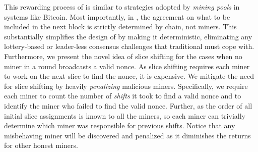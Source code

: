 This rewarding process of \PoC{} is similar to strategies adopted by 
{\em mining pools} in systems like Bitcoin. Most importantly, in \PoC{}, the 
agreement on what to be included in the next block is strictly determined by \PBFT{} 
chain, not miners. This substantially simplifies the design of \PoC{} by making it 
deterministic, eliminating any lottery-based or leader-less consensus challenges 
that traditional \PoW{} must cope with. Furthermore, we present the novel idea of 
slice shifting for the cases when no miner in a round broadcasts a valid nonce. 
As slice shifting requires each miner to work on the next slice to find the nonce, 
it is expensive. We mitigate the need for slice shifting by heavily {\em penalizing} 
malicious miners. Specifically, we require each miner to count the number of 
{\em shifts} it took to find a valid nonce and to identify the miner who failed 
to find the valid nonce. Further, as the order of all initial slice assignments is known 
to all the miners, so each miner can trivially determine which miner was responsible 
for previous shifts. Notice that any misbehaving miner will be discovered and penalized 
as it diminishes the returns for other honest miners. 




%


%
%
%
